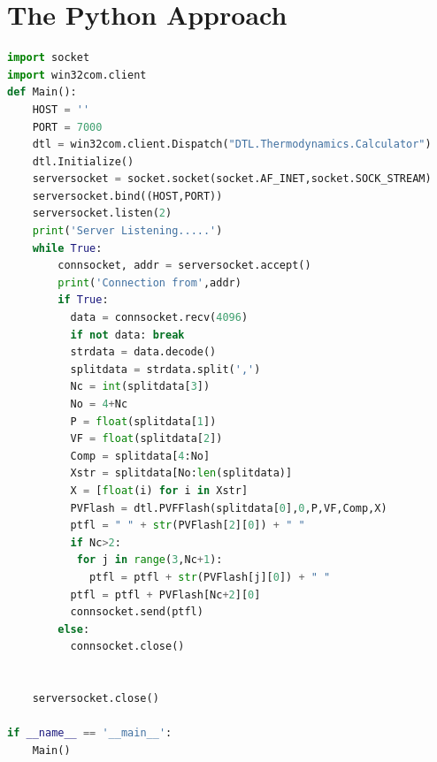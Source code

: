 \documentclass[12pt]{report}
\begin{document}
\section{The Python Approach}
\begin{lstlisting}[language=Python]
import socket
import win32com.client
def Main():
    HOST = ''
    PORT = 7000
    dtl = win32com.client.Dispatch("DTL.Thermodynamics.Calculator")
    dtl.Initialize()
    serversocket = socket.socket(socket.AF_INET,socket.SOCK_STREAM)
    serversocket.bind((HOST,PORT))
    serversocket.listen(2)
    print('Server Listening.....')
    while True:
        connsocket, addr = serversocket.accept()
        print('Connection from',addr)
        if True:
          data = connsocket.recv(4096)
          if not data: break
          strdata = data.decode()
          splitdata = strdata.split(',')
          Nc = int(splitdata[3])
          No = 4+Nc
          P = float(splitdata[1])
          VF = float(splitdata[2])
          Comp = splitdata[4:No]
          Xstr = splitdata[No:len(splitdata)]
          X = [float(i) for i in Xstr]
          PVFlash = dtl.PVFFlash(splitdata[0],0,P,VF,Comp,X)
          ptfl = " " + str(PVFlash[2][0]) + " "
          if Nc>2:
           for j in range(3,Nc+1):
             ptfl = ptfl + str(PVFlash[j][0]) + " "
          ptfl = ptfl + PVFlash[Nc+2][0]
          connsocket.send(ptfl)
        else:
          connsocket.close()
        
        
    serversocket.close()
   
if __name__ == '__main__':
    Main()   
\end{lstlisting}
\end{document}
